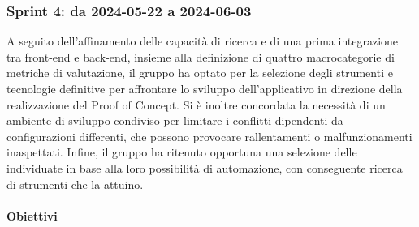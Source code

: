 \subsubsection{Sprint 4: da 2024-05-22 a 2024-06-03}
A seguito dell'affinamento delle capacità di ricerca e di una prima integrazione tra front-end e back-end, insieme alla definizione di quattro macrocategorie di metriche di valutazione, il gruppo ha optato per la selezione degli strumenti e tecnologie definitive per affrontare lo sviluppo dell'applicativo in direzione della realizzazione del Proof of Concept.
Si è inoltre concordata la necessità di un ambiente di sviluppo condiviso per limitare i conflitti dipendenti da configurazioni differenti, che possono provocare rallentamenti o malfunzionamenti inaspettati. Infine, il gruppo ha ritenuto opportuna una selezione delle  individuate in base alla loro possibilità di automazione, con conseguente ricerca di strumenti che la attuino.

\paragraph{Obiettivi}

\vspace{0.5\baselineskip}
\par [Inserire Gantt]